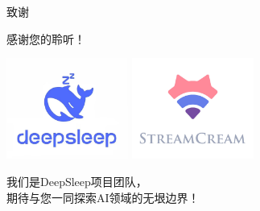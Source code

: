 \documentclass{beamer}
\begin{document}
\begin{frame}{致谢}
    \begin{center}
        \huge 感谢您的聆听！ \\
    \end{center}
    \begin{center} %
        \includegraphics[width=4cm]{pic/队伍徽标.jpg}
        \hspace{0.5cm} %
        \includegraphics[width=4cm]{pic/项目图标.jpg}
    \end{center}
    \begin{center}
        \large 我们是DeepSleep项目团队， \\
        \large 期待与您一同探索AI领域的无垠边界！
    \end{center}
\end{frame}
\end{document}

